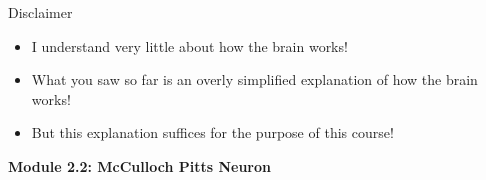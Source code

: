 \documentclass[serif, aspectratio=169]{beamer}
\newcommand\myheading[1]{%
\par\bigskip
{\Large\bfseries#1}\par\smallskip}
\begin{document}
\begin{frame}
\begin{columns}
\begin{overlayarea}{\textwidth}{\textheight}



\end{overlayarea}
\end{columns}
\end{frame}

\begin{frame}
\begin{block}{Disclaimer}
\begin{itemize}\justifying
\item I understand very little about how the brain works!
\item What you saw so far is an overly simplified explanation of how the brain works!
\item But this explanation suffices for the purpose of this course!
\end{itemize}
\end{block}
\end{frame}

  \begin{frame}
    \myheading{Module 2.2: McCulloch Pitts Neuron}
  \end{frame}
\end{document}
